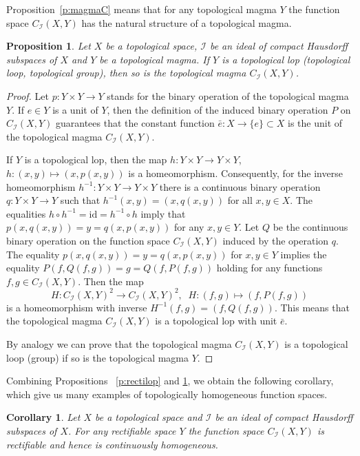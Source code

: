 \documentclass{amsart}
\newtheorem{proposition}[theorem]{Proposition}
\newtheorem{corollary}[theorem]{Corollary}
\theoremstyle{definition}
\begin{document}
Proposition~\ref{p:magmaC} means that for any topological magma $Y$ the function space $C_{\mathcal I}(X,Y)$ has the natural structure of a topological magma.

\begin{proposition}\label{p4.3} Let $X$ be a topological space, ${\mathcal I}$ be an ideal of compact Hausdorff subspaces of $X$ and $Y$ be a topological magma. If $Y$ is a topological lop (topological loop, topological group), then so is the topological magma $C_{\mathcal I}(X,Y)$.
\end{proposition}

\begin{proof} Let $p:Y\times Y\to Y$ stands for the binary operation of the topological magma $Y$.
If $e\in Y$ is a unit of $Y$, then the definition of the induced binary operation $P$ on $C_{\mathcal I}(X,Y)$ guarantees that the constant function $\bar e:X\to\{e\}\subset X$ is the unit of the topological magma $C_{\mathcal I}(X,Y)$.

If $Y$ is a topological lop, then the map $h:Y\times Y\to Y\times Y$, $h:(x,y)\mapsto (x,p(x,y))$ is a homeomorphism. Consequently, for the inverse homeomorphism $h^{-1}:Y\times Y\to Y\times Y$ there is a continuous binary operation $q:Y\times Y\to Y$ such that $h^{-1}(x,y)=(x,q(x,y))$ for all $x,y\in X$. The equalities $h\circ h^{-1}={\mathrm{id}}=h^{-1}\circ h$ imply that $p(x,q(x,y))=y=q(x,p(x,y))$ for any $x,y\in Y$. Let $Q$ be the continuous binary operation on the function space $C_{\mathcal I}(X,Y)$ induced by the operation $q$. The equality $p(x,q(x,y))=y=q(x,p(x,y))$ for $x,y\in Y$ implies the equality $P(f,Q(f,g))=g=Q(f,P(f,g))$ holding for any functions $f,g\in C_{\mathcal I}(X,Y)$. Then the map $$H:C_{\mathcal I}(X,Y)^2\to C_{\mathcal I}(X,Y)^2,\;\;H:(f,g)\mapsto (f,P(f,g))$$is a homeomorphism with inverse $H^{-1}(f,g)=(f,Q(f,g))$. This means that the topological magma $C_{\mathcal I}(X,Y)$ is a topological lop with unit $\bar e$.

By analogy we can prove that the topological magma $C_{\mathcal I}(X,Y)$ is a topological loop (group) if so is the topological magma $Y$.
\end{proof}

Combining Propositions~ \ref{p:rectilop} and \ref{p4.3}, we obtain the following corollary, which give us many examples of topologically homogeneous function spaces.

\begin{corollary}\label{c:rectiF} Let $X$ be a topological space and ${\mathcal I}$ be an ideal of compact Hausdorff subspaces of $X$. For any rectifiable space $Y$ the function space $C_{\mathcal I}(X,Y)$ is rectifiable and hence is continuously homogeneous.
\end{corollary}
\end{document}
